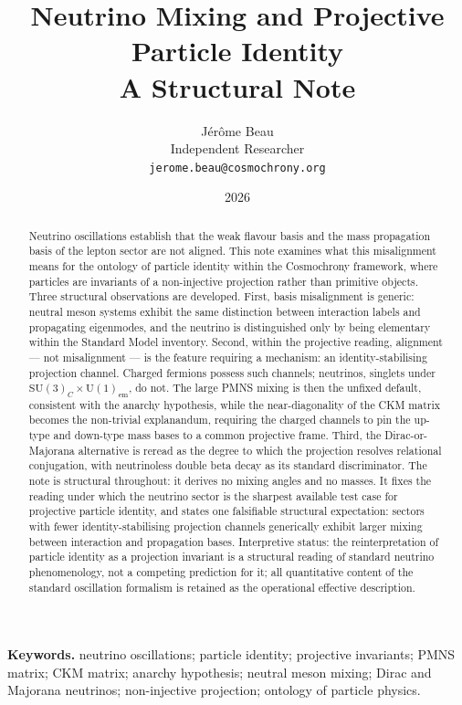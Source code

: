 \documentclass[11pt,a4paper]{article}
\title{Neutrino Mixing and Projective Particle Identity\\[0.4em]
\large A Structural Note}
\author{J\'{e}r\^{o}me Beau\\[0.3em]
\small Independent Researcher\\
\small \texttt{jerome.beau@cosmochrony.org}}
\date{2026}
\theoremstyle{definition}
\newcommand{\SU}{\mathrm{SU}}
\newcommand{\UU}{\mathrm{U}}
\begin{document}
  \maketitle

  \begin{abstract}
    Neutrino oscillations establish that the weak flavour basis and the mass propagation basis of the lepton
    sector are not aligned.
    This note examines what this misalignment means for the ontology of particle identity within the Cosmochrony
    framework, where particles are invariants of a non-injective projection rather than primitive objects.
    Three structural observations are developed.
    First, basis misalignment is generic: neutral meson systems exhibit the same distinction between interaction
    labels and propagating eigenmodes, and the neutrino is distinguished only by being elementary within the
    Standard Model inventory.
    Second, within the projective reading, alignment --- not misalignment --- is the feature requiring a
    mechanism: an identity-stabilising projection channel.
    Charged fermions possess such channels; neutrinos, singlets under $\SU(3)_C \times \UU(1)_{\mathrm{em}}$,
    do not.
    The large PMNS mixing is then the unfixed default, consistent with the anarchy hypothesis, while the
    near-diagonality of the CKM matrix becomes the non-trivial explanandum, requiring the charged channels to pin
    the up-type and down-type mass bases to a common projective frame.
    Third, the Dirac-or-Majorana alternative is reread as the degree to which the projection resolves relational
    conjugation, with neutrinoless double beta decay as its standard discriminator.
    The note is structural throughout: it derives no mixing angles and no masses.
    It fixes the reading under which the neutrino sector is the sharpest available test case for projective
    particle identity, and states one falsifiable structural expectation: sectors with fewer identity-stabilising
    projection channels generically exhibit larger mixing between interaction and propagation bases.
    Interpretive status: the reinterpretation of particle identity as a projection invariant is a structural
    reading of standard neutrino phenomenology, not a competing prediction for it; all quantitative content of
    the standard oscillation formalism is retained as the operational effective description.
  \end{abstract}

  \medskip
  \noindent\textbf{Keywords.}
  neutrino oscillations; particle identity; projective invariants; PMNS matrix; CKM matrix; anarchy hypothesis;
  neutral meson mixing; Dirac and Majorana neutrinos; non-injective projection; ontology of particle physics.
\end{document}
